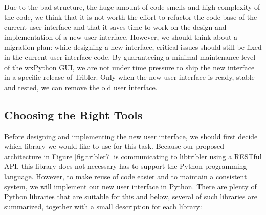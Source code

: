 Due to the bad structure, the huge amount of code smells and high complexity of the code, we think that it is not worth the effort to refactor the code base of the current user interface and that it saves time to work on the design and implementation of a new user interface. However, we should think about a migration plan: while designing a new interface, critical issues should still be fixed in the current user interface code. By guaranteeing a minimal maintenance level of the wxPython GUI, we are not under time pressure to ship the new interface in a specific release of Tribler. Only when the new user interface is ready, stable and tested, we can remove the old user interface.

\subsection{Choosing the Right Tools}
Before designing and implementing the new user interface, we should first decide which library we would like to use for this task. Because our proposed architecture in Figure \ref{fig:tribler7} is communicating to libtribler using a RESTful API, this library does not necessary has to support the Python programming language. However, to make reuse of code easier and to maintain a consistent system, we will implement our new user interface in Python. There are plenty of Python libraries that are suitable for this and below, several of such libraries are summarized, together with a small description for each library:
